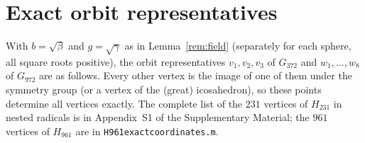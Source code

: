 \documentclass[11pt]{article}
\renewcommand{\_}{\textunderscore\allowbreak}
\theoremstyle{remark}
\begin{document}



\appendix
\section{Exact orbit representatives}\label{app:reps}

With $b=\sqrt\beta$ and $g=\sqrt\gamma$ as in Lemma~\ref{rem:field} (separately for each sphere, all
square roots positive), the orbit representatives $v_1,v_2,v_3$ of $G_{372}$ and $w_1,\dots,w_8$ of $G_{972}$ are as follows.
Every other vertex is the image of one of them under the symmetry group (or a vertex of the (great)
icosahedron), so these points determine all vertices exactly. The complete list of the $231$ vertices of
$H_{231}$ in nested radicals is in Appendix~S1 of the Supplementary Material; the $961$ vertices of $H_{961}$ are in
\texttt{H961\_exact\_coordinates.m}.
\end{document}

